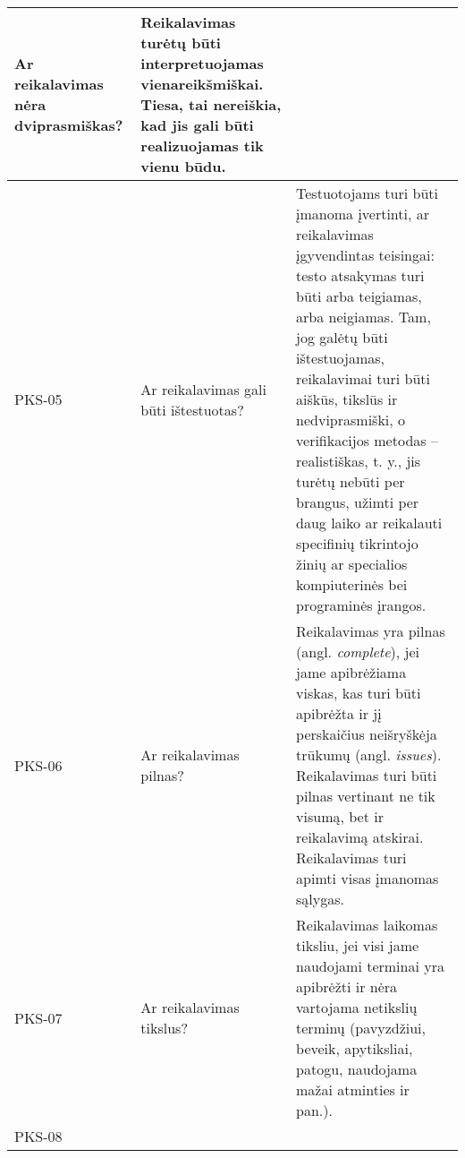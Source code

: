 \documentclass{VUMIFPSkursinis}
\begin{document}
\begin{center}
\begin{longtable}{|C{2cm}|L{5cm}|L{8cm}|}
		Ar reikalavimas nėra dviprasmiškas?                                             &
		Reikalavimas turėtų būti interpretuojamas \textbf{vienareikšmiškai}. Tiesa, tai nereiškia, kad jis gali būti realizuojamas tik vienu būdu.                                                                                                                                                                                                                                                                                                    \\ \hline
		PKS-05                                                                          &
		Ar reikalavimas gali būti ištestuotas?                                          &
		Testuotojams turi būti įmanoma įvertinti, ar reikalavimas įgyvendintas teisingai: testo atsakymas turi būti arba teigiamas, arba neigiamas. Tam, jog galėtų būti ištestuojamas, reikalavimai turi būti aiškūs, tikslūs ir nedviprasmiški, o verifikacijos metodas -- realistiškas, t. y., jis turėtų nebūti per brangus, užimti per daug laiko ar reikalauti specifinių tikrintojo žinių ar specialios kompiuterinės bei programinės įrangos. \\ \hline
		PKS-06                                                                          &
		Ar reikalavimas pilnas?                                                         &
		Reikalavimas yra pilnas (angl. \textit{complete}), jei jame apibrėžiama viskas, kas turi būti apibrėžta ir jį perskaičius neišryškėja trūkumų (angl. \textit{issues}). Reikalavimas turi būti pilnas vertinant ne tik visumą, bet ir reikalavimą atskirai. Reikalavimas turi apimti visas įmanomas sąlygas.                                                                                                                                   \\ \hline
		PKS-07                                                                          &
		Ar reikalavimas tikslus?                                                        &
		Reikalavimas laikomas tiksliu, jei visi jame naudojami terminai yra apibrėžti ir nėra vartojama netikslių terminų (pavyzdžiui, beveik, apytiksliai, patogu, naudojama mažai atminties ir pan.).                                                                                                                                                                                                                                               \\ \hline
		PKS-08                                                                          &

\end{longtable}
\end{center}
\end{document}
